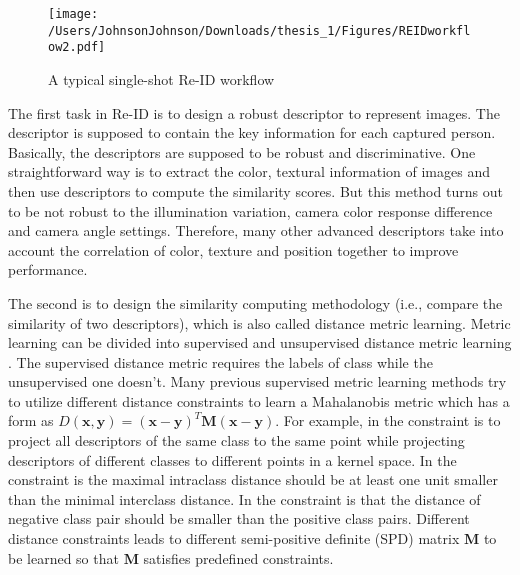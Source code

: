 \begin{figure}[H]
\centering
\texttt{[image: /Users/JohnsonJohnson/Downloads/thesis\_1/Figures/REIDworkflow2.pdf]}
\vspace{1em}
\caption{A typical single-shot Re-ID workflow}
\end{figure}




The first task in Re-ID is to design a robust descriptor to represent images. The descriptor is supposed to contain the key information for each captured person. Basically, the descriptors are supposed to be robust and discriminative. One straightforward way is to extract the color, textural information of images and then use descriptors to compute the similarity scores. But this method turns out to be not robust to the illumination variation, camera color response difference and camera angle settings.  Therefore, many other advanced descriptors take into account the correlation of color, texture and position together to improve performance.

The second is to design the similarity computing methodology (i.e., compare the similarity of two descriptors), which is also called distance metric learning. Metric learning can be divided into supervised and unsupervised distance metric learning \cite{MetricLearningSurvey}. The supervised distance metric requires the labels of class while the unsupervised one doesn't. Many previous supervised metric learning methods try to utilize different distance constraints to learn a Mahalanobis metric which has a form as $D(\bm{x},\bm{y}) = (\bm{x} - \bm{y})^T\bm{M}(\bm{x} - \bm{y})$. For example, in \cite{NFST} the constraint is to project all descriptors of the same class to the same point while projecting descriptors of different classes to different points in a kernel space. In \cite{TDL} the constraint is the maximal intraclass distance should be at least one unit smaller than the minimal interclass distance. In \cite{PRDC} the constraint is that the distance of negative class pair should be smaller than the positive class pairs. Different distance constraints leads to different semi-positive definite (SPD) matrix $\bm{M}$ to be learned so that $\bm{M}$ satisfies predefined constraints.

